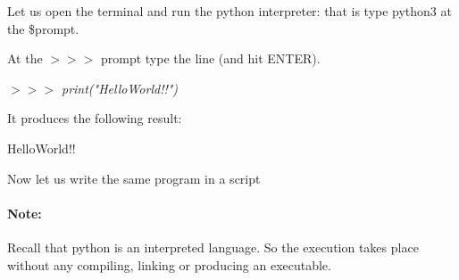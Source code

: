\documentclass[]{book}
\begin{document}
    Let us open the terminal and run the python interpreter: that is type python3 at the \$prompt.
    
    At the \emph{$>>>$} prompt type the line (and hit ENTER).

    \emph{$>>>$ print("HelloWorld!!")}
    
    It produces the following result:
    
    HelloWorld!!

    Now let us write the same program in a script

    \paragraph{Note:} Recall that python is an interpreted language. So the execution takes place without any compiling, linking or producing an executable.
\end{document}
